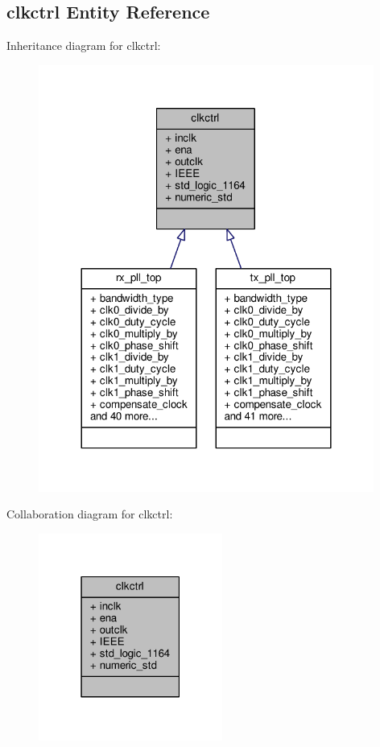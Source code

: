 \subsection{clkctrl Entity Reference}
\label{classclkctrl}


Inheritance diagram for clkctrl\+:\nopagebreak
\begin{figure}[H]
\begin{center}
\leavevmode
\includegraphics[width=312pt]{da/d36/classclkctrl__inherit__graph}
\end{center}
\end{figure}


Collaboration diagram for clkctrl\+:\nopagebreak
\begin{figure}[H]
\begin{center}
\leavevmode
\includegraphics[width=171pt]{d1/d19/classclkctrl__coll__graph}
\end{center}
\end{figure}
